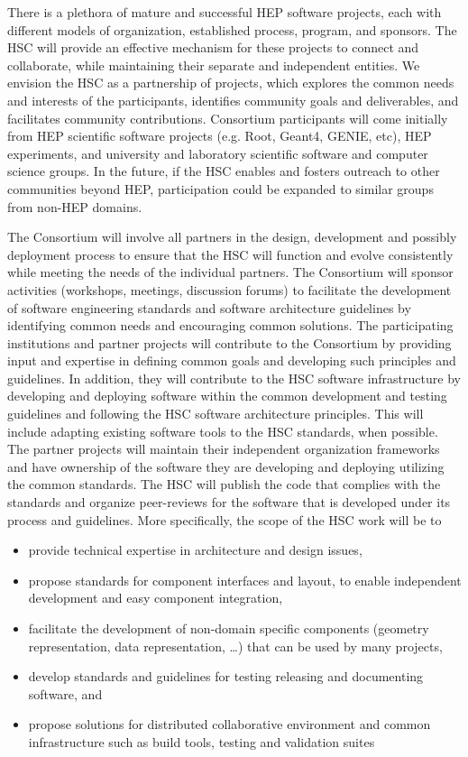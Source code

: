 \documentclass[12pt,letterpaper,fleqn]{article}
\begin{document}
There is a plethora of mature and successful HEP software projects,
each with different models of organization, established process,
program, and sponsors.  The HSC will provide an effective mechanism
for these projects to connect and collaborate, while maintaining
their separate and independent entities.  We envision the HSC as a
partnership of projects, which explores the common needs and interests
of the participants, identifies community goals and deliverables,
and facilitates community contributions. Consortium participants
will come initially from HEP scientific software projects (e.g.
Root, Geant4, GENIE, etc), HEP experiments, and university and
laboratory scientific software and computer science groups.  In the
future, if the HSC enables and fosters outreach to other communities
beyond HEP, participation could be expanded to similar groups from
non-HEP domains.

The Consortium will involve all partners in the design, development
and possibly deployment process to ensure that the HSC will function
and evolve consistently while meeting the needs of the individual
partners.  The Consortium will sponsor activities (workshops,
meetings, discussion forums) to facilitate the development of
software engineering standards and software architecture guidelines
by identifying common needs and encouraging common solutions. The
participating institutions and partner projects will contribute to
the Consortium by providing input and expertise in defining common
goals and developing such principles and guidelines.  In addition,
they will contribute to the HSC software infrastructure by developing
and deploying software within the common development and testing
guidelines and following the HSC software architecture principles.
This will include adapting existing software tools to the HSC
standards, when possible.  The partner projects will maintain their
independent organization frameworks and have ownership of the
software they are developing and deploying utilizing the common
standards.  The HSC will publish the code that complies with the
standards and organize peer-reviews for the software that is developed
under its process and guidelines.  More specifically, the scope of
the HSC work will be to
\begin{itemize}
\item provide technical expertise in architecture and design issues,
\item propose standards for component interfaces and layout, to enable independent development and easy component integration, 
\item facilitate the development of non-domain specific components (geometry representation, data representation, …) that can be used by many projects,
\item develop standards and guidelines for testing releasing and documenting software, and
\item propose solutions for distributed collaborative environment and common infrastructure such as build tools, testing and validation suites
\end{itemize}
\end{document}
